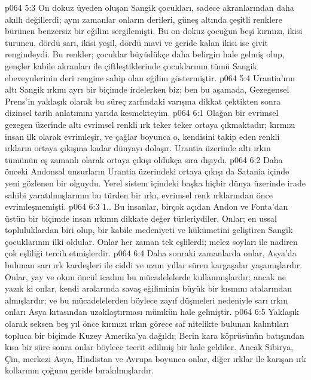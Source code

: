\vs p064 5:3 On dokuz üyeden oluşan Sangik çocukları, sadece akranlarından daha akıllı değillerdi; aynı zamanlar onların derileri, güneş altında çeşitli renklere bürünen benzersiz bir eğilim sergilemişti. Bu on dokuz çocuğun beşi kırmızı, ikisi turuncu, dördü sarı, ikisi yeşil, dördü mavi ve geride kalan ikisi ise çivit rengindeydi. Bu renkler; çocuklar büyüdükçe daha belirgin hale gelmiş olup, gençler kabile akranları ile çiftleştiklerinde çocuklarının tümü Sangik ebeveynlerinin deri rengine sahip olan eğilim göstermiştir.
\vs p064 5:4 Urantia’nın altı Sangik ırkını ayrı bir biçimde irdelerken biz; ben bu aşamada, Gezegensel Prens’in yaklaşık olarak bu süreç zarfındaki varışına dikkat çektikten sonra dizinsel tarih anlatımını yarıda kesmekteyim.
\vs p064 6:1 Olağan bir evrimsel gezegen üzerinde altı evrimsel renkli ırk teker teker ortaya çıkmaktadır; kırmızı insan ilk olarak evrimleşir, ve çağlar boyunca o, kendisini takip eden renkli ırkların ortaya çıkışına kadar dünyayı dolaşır. Urantia üzerinde altı ırkın tümünün eş zamanlı olarak  ortaya çıkışı oldukça sıra dışıydı.
\vs p064 6:2 Daha önceki Andonsal unsurların Urantia üzerindeki ortaya çıkışı da Satania içinde yeni gözlenen bir olguydu. Yerel sistem içindeki başka hiçbir dünya üzerinde irade sahibi yaratılmışlarının bu türden bir ırkı, evrimsel renk ırklarından önce evrimleşmemişti.
\vs p064 6:3 1.\bibnobreakspace {}. Bu insanlar, birçok açıdan Andon ve Fonta’dan üstün bir biçimde insan ırkının dikkate değer türleriydiler. Onlar; en ussal topluluklardan biri olup, bir kabile medeniyeti ve hükümetini geliştiren Sangik çocuklarının ilki oldular. Onlar her zaman tek eşlilerdi; melez soyları ile nadiren çok eşliliği tercih etmişlerdir.
\vs p064 6:4 Daha sonraki zamanlarda onlar, Asya’da bulunan sarı ırk kardeşleri ile ciddi ve uzun yıllar süren kargaşalar yaşamışlardır. Onlar, yay ve okun öncül icadını bu mücadelelerde kullanmışlardır; ancak ne yazık ki onlar, kendi aralarında savaş eğiliminin büyük bir kısmını atalarından almışlardır; ve bu mücadelelerden böylece zayıf düşmeleri nedeniyle sarı ırkın onları Asya kıtasından uzaklaştırması mümkün hale gelmiştir.
\vs p064 6:5 Yaklaşık olarak seksen beş yıl önce kırmızı ırkın görece saf nitelikte bulunan kalıntıları topluca bir biçimde Kuzey Amerika’ya dağıldı; Berin kara köprüsünün batışından kısa bir süre sonra onlar böylece tecrit edilmiş bir hale geldiler. Ancak Sibirya, Çin, merkezi Asya, Hindistan ve Avrupa boyunca onlar, diğer ırklar ile karışan ırk kollarının çoğunu geride bırakılmışlardır.

